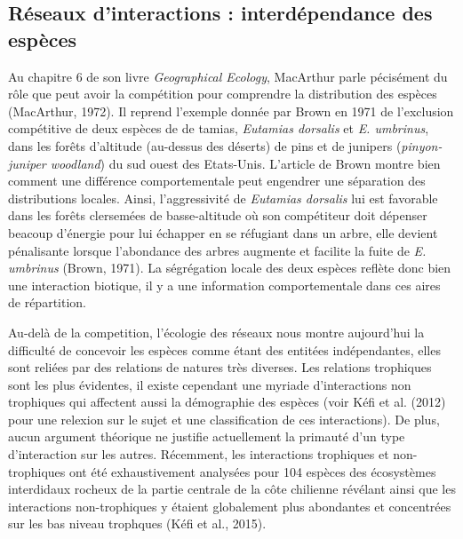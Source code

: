 \subsection*{Réseaux d'interactions : interdépendance des
espèces}\label{ruxe9seaux-dinteractions-interduxe9pendance-des-espuxe8ces}

Au chapitre 6 de son livre \emph{Geographical Ecology}, MacArthur parle
pécisément du rôle que peut avoir la compétition pour comprendre la
distribution des espèces (MacArthur, 1972). Il reprend l'exemple donnée
par Brown en 1971 de l'exclusion compétitive de deux espèces de de
tamias, \emph{Eutamias dorsalis} et \emph{E. umbrinus}, dans les forêts
d'altitude (au-dessus des déserts) de pins et de junipers
(\emph{pinyon-juniper woodland}) du sud ouest des Etats-Unis. L'article
de Brown montre bien comment une différence comportementale peut
engendrer une séparation des distributions locales. Ainsi,
l'aggressivité de \emph{Eutamias dorsalis} lui est favorable dans les
forêts clersemées de basse-altitude où son compétiteur doit dépenser
beacoup d'énergie pour lui échapper en se réfugiant dans un arbre, elle
devient pénalisante lorsque l'abondance des arbres augmente et facilite
la fuite de \emph{E. umbrinus} (Brown, 1971). La ségrégation locale des
deux espèces reflète donc bien une interaction biotique, il y a une
information comportementale dans ces aires de répartition.

Au-delà de la competition, l'écologie des réseaux nous montre
aujourd'hui la difficulté de concevoir les espèces comme étant des
entitées indépendantes, elles sont reliées par des relations de natures
très diverses. Les relations trophiques sont les plus évidentes, il
existe cependant une myriade d'interactions non trophiques qui affectent
aussi la démographie des espèces (voir Kéfi et al. (2012) pour une
relexion sur le sujet et une classification de ces interactions). De
plus, aucun argument théorique ne justifie actuellement la primauté d'un
type d'interaction sur les autres. Récemment, les interactions
trophiques et non-trophiques ont été exhaustivement analysées pour 104
espèces des écosystèmes interdidaux rocheux de la partie centrale de la
côte chilienne révélant ainsi que les interactions non-trophiques y
étaient globalement plus abondantes et concentrées sur les bas niveau
trophques (Kéfi et al., 2015).

